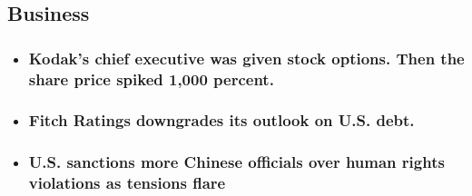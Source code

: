 \begin{itemize}
  \hypertarget{business}{%
  \subsection{Business}\label{business}}

  \begin{itemize}
  \item
    \href{https://www.nytimes.com/live/2020/07/31/business/stock-market-today-coronavirus?type=styln-live-updates\&label=business\&index=1\#kodaks-chief-executive-was-given-stock-options-then-the-share-price-spiked-1000-percent}{}

    \hypertarget{kodaks-chief-executive-was-given-stock-options-then-the-share-price-spiked-1000-percent}{%
    \subsubsection{Kodak's chief executive was given stock options. Then
    the share price spiked 1,000
    percent.}\label{kodaks-chief-executive-was-given-stock-options-then-the-share-price-spiked-1000-percent}}
  \item
    \href{https://www.nytimes.com/live/2020/07/31/business/stock-market-today-coronavirus?type=styln-live-updates\&label=business\&index=1\#fitch-ratings-downgrades-its-outlook-on-us-debt}{}

    \hypertarget{fitch-ratings-downgrades-its-outlook-on-us-debt}{%
    \subsubsection{Fitch Ratings downgrades its outlook on U.S.
    debt.}\label{fitch-ratings-downgrades-its-outlook-on-us-debt}}
  \item
    \href{https://www.nytimes.com/live/2020/07/31/business/stock-market-today-coronavirus?type=styln-live-updates\&label=business\&index=1\#us-sanctions-more-chinese-officials-over-human-rights-violations-as-tensions-flare}{}

    \hypertarget{us-sanctions-more-chinese-officials-over-human-rights-violations-as-tensions-flare}{%
    \subsubsection{U.S. sanctions more Chinese officials over human
    rights violations as tensions
    flare}\label{us-sanctions-more-chinese-officials-over-human-rights-violations-as-tensions-flare}}
  \end{itemize}
\end{itemize}

